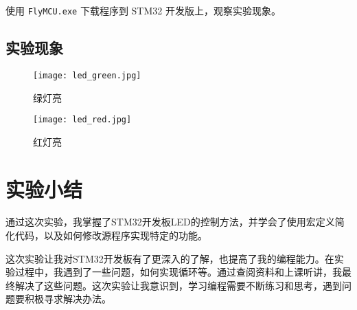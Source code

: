 \documentclass{math201}
\begin{document}
使用 \texttt{FlyMCU.exe} 下载程序到 STM32 开发版上，观察实验现象。

\subsection{实验现象}

\begin{figure}[H]
  \centering\texttt{[image: led\_green.jpg]}
  \caption{绿灯亮}      
\end{figure}

\begin{figure}[H]
  \centering\texttt{[image: led\_red.jpg]}
  \caption{红灯亮}
\end{figure}

\section{实验小结}

通过这次实验，我掌握了STM32开发板LED的控制方法，并学会了使用宏定义简化代码，以及如何修改源程序实现特定的功能。

这次实验让我对STM32开发板有了更深入的了解，也提高了我的编程能力。在实验过程中，我遇到了一些问题，如何实现循环等。通过查阅资料和上课听讲，我最终解决了这些问题。这次实验让我意识到，学习编程需要不断练习和思考，遇到问题要积极寻求解决办法。
\end{document}
